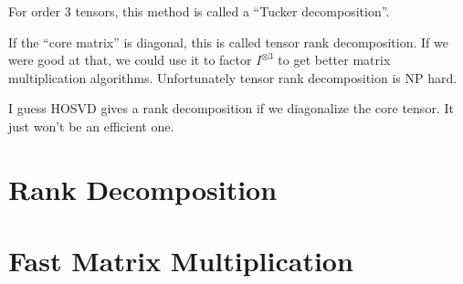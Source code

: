 \documentclass[oneside]{book}
\begin{document}
For order $3$ tensors, this method is called a ``Tucker decomposition''.

If the ``core matrix'' is diagonal, this is called tensor rank decomposition.
If we were good at that, we could use it to factor $I^{\otimes 3}$ to get better matrix multiplication algorithms.
Unfortunately tensor rank decomposition is NP hard.

I guess HOSVD gives a rank decomposition if we diagonalize the core tensor.
It just won't be an efficient one.

\section{Rank Decomposition}

\section{Fast Matrix Multiplication}
\end{document}
